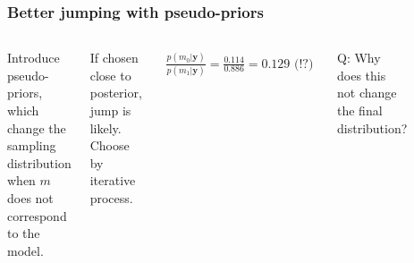 \documentclass[usenames,dvipsnames,table]{beamer}
\begin{document}
\begin{frame}
\frametitle{Better jumping with pseudo-priors}
\begin{columns}[c]
Introduce pseudo-priors, which change the sampling distribution when $m$ does not correspond to the model.

\vspace{1em}
If chosen close to posterior, jump is likely. Choose by iterative process.

\begin{align*}
\frac{p(m_0|\mathbf{y})}
     {p(m_1|\mathbf{y})}
    =  \frac{0.114}
             {0.886}
    = 0.129 \text{ (!?)}
\end{align*}

\vspace{1em}
Q: Why does this not change the final distribution?
\begin{figure}
\centering
\includegraphics[height=.8\textheight]{img/fig10_6}
\end{figure}
\end{columns}
\end{frame}
\end{document}
